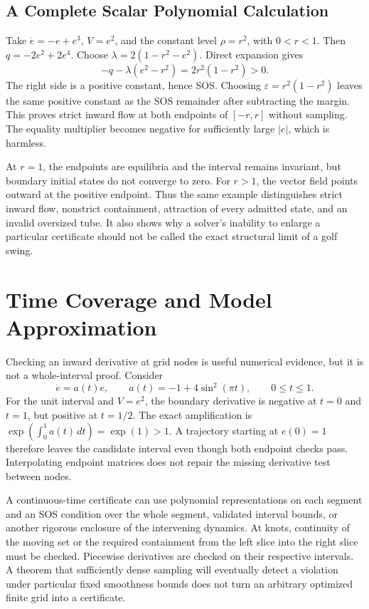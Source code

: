 \documentclass[12pt, openany]{book}
\theoremstyle{plain}
\begin{document}
\subsection{A Complete Scalar Polynomial Calculation}

Take $\dot e=-e+e^3$, $V=e^2$, and the constant level $\rho=r^2$, with $0<r<1$. Then $q=-2e^2+2e^4$. Choose $\lambda=2(1-r^2-e^2)$. Direct expansion gives
\begin{equation}
 -q-\lambda(e^2-r^2)=2r^2(1-r^2)>0.
 \label{eq:funnel_polynomial_identity}
\end{equation}
The right side is a positive constant, hence SOS. Choosing $\varepsilon=r^2(1-r^2)$ leaves the same positive constant as the SOS remainder after subtracting the margin. This proves strict inward flow at both endpoints of $[-r,r]$ without sampling. The equality multiplier becomes negative for sufficiently large $|e|$, which is harmless.

At $r=1$, the endpoints are equilibria and the interval remains invariant, but boundary initial states do not converge to zero. For $r>1$, the vector field points outward at the positive endpoint. Thus the same example distinguishes strict inward flow, nonstrict containment, attraction of every admitted state, and an invalid oversized tube. It also shows why a solver's inability to enlarge a particular certificate should not be called the exact structural limit of a golf swing.

\section{Time Coverage and Model Approximation}

Checking an inward derivative at grid nodes is useful numerical evidence, but it is not a whole-interval proof. Consider
\begin{equation}
 \dot e=a(t)e,\qquad a(t)=-1+4\sin^2(\pi t),\qquad 0\leq t\leq1.
 \label{eq:funnel_time_sampling}
\end{equation}
For the unit interval and $V=e^2$, the boundary derivative is negative at $t=0$ and $t=1$, but positive at $t=1/2$. The exact amplification is $\exp(\int_0^1a(t)\,dt)=\exp(1)>1$. A trajectory starting at $e(0)=1$ therefore leaves the candidate interval even though both endpoint checks pass. Interpolating endpoint matrices does not repair the missing derivative test between nodes.

A continuous-time certificate can use polynomial representations on each segment and an SOS condition over the whole segment, validated interval bounds, or another rigorous enclosure of the intervening dynamics. At knots, continuity of the moving set or the required containment from the left slice into the right slice must be checked. Piecewise derivatives are checked on their respective intervals. A theorem that sufficiently dense sampling will eventually detect a violation under particular fixed smoothness bounds does not turn an arbitrary optimized finite grid into a certificate.
\end{document}
